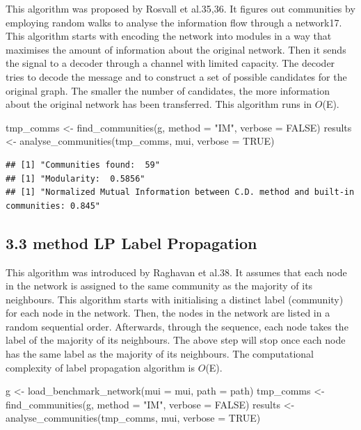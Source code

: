 \documentclass[
]{article}
\newenvironment{Shaded}{\begin{snugshade}}{\end{snugshade}}
\newcommand{\AttributeTok}[1]{\textcolor[rgb]{0.77,0.63,0.00}{#1}}
\newcommand{\ConstantTok}[1]{\textcolor[rgb]{0.00,0.00,0.00}{#1}}
\newcommand{\FunctionTok}[1]{\textcolor[rgb]{0.00,0.00,0.00}{#1}}
\newcommand{\NormalTok}[1]{#1}
\newcommand{\OtherTok}[1]{\textcolor[rgb]{0.56,0.35,0.01}{#1}}
\newcommand{\StringTok}[1]{\textcolor[rgb]{0.31,0.60,0.02}{#1}}
\begin{document}
This algorithm was proposed by Rosvall et al.35,36. It figures out
communities by employing random walks to analyse the information flow
through a network17. This algorithm starts with encoding the network
into modules in a way that maximises the amount of information about the
original network. Then it sends the signal to a decoder through a
channel with limited capacity. The decoder tries to decode the message
and to construct a set of possible candidates for the original graph.
The smaller the number of candidates, the more information about the
original network has been transferred. This algorithm runs in \(O\)(E).

\begin{Shaded}
\begin{Highlighting}[]
\NormalTok{tmp\_comms }\OtherTok{\textless{}{-}} \FunctionTok{find\_communities}\NormalTok{(g, }\AttributeTok{method =} \StringTok{"IM"}\NormalTok{, }\AttributeTok{verbose =} \ConstantTok{FALSE}\NormalTok{)}
\NormalTok{results }\OtherTok{\textless{}{-}} \FunctionTok{analyse\_communities}\NormalTok{(tmp\_comms, mui, }\AttributeTok{verbose =} \ConstantTok{TRUE}\NormalTok{)}
\end{Highlighting}
\end{Shaded}

\begin{verbatim}
## [1] "Communities found:  59"
## [1] "Modularity:  0.5856"
## [1] "Normalized Mutual Information between C.D. method and built-in communities: 0.845"
\end{verbatim}

\hypertarget{method-lp-label-propagation}{%
\subsection{3.3 method LP Label
Propagation}\label{method-lp-label-propagation}}

This algorithm was introduced by Raghavan et al.38. It assumes that each
node in the network is assigned to the same community as the majority of
its neighbours. This algorithm starts with initialising a distinct label
(community) for each node in the network. Then, the nodes in the network
are listed in a random sequential order. Afterwards, through the
sequence, each node takes the label of the majority of its neighbours.
The above step will stop once each node has the same label as the
majority of its neighbours. The computational complexity of label
propagation algorithm is \(O\)(E).

\begin{Shaded}
\begin{Highlighting}[]
\NormalTok{g }\OtherTok{\textless{}{-}} \FunctionTok{load\_benchmark\_network}\NormalTok{(}\AttributeTok{mui =}\NormalTok{ mui, }\AttributeTok{path =}\NormalTok{ path)}
\NormalTok{tmp\_comms }\OtherTok{\textless{}{-}} \FunctionTok{find\_communities}\NormalTok{(g, }\AttributeTok{method =} \StringTok{"IM"}\NormalTok{, }\AttributeTok{verbose =} \ConstantTok{FALSE}\NormalTok{)}
\NormalTok{results }\OtherTok{\textless{}{-}} \FunctionTok{analyse\_communities}\NormalTok{(tmp\_comms, mui, }\AttributeTok{verbose =} \ConstantTok{TRUE}\NormalTok{)}
\end{Highlighting}
\end{Shaded}
\end{document}

